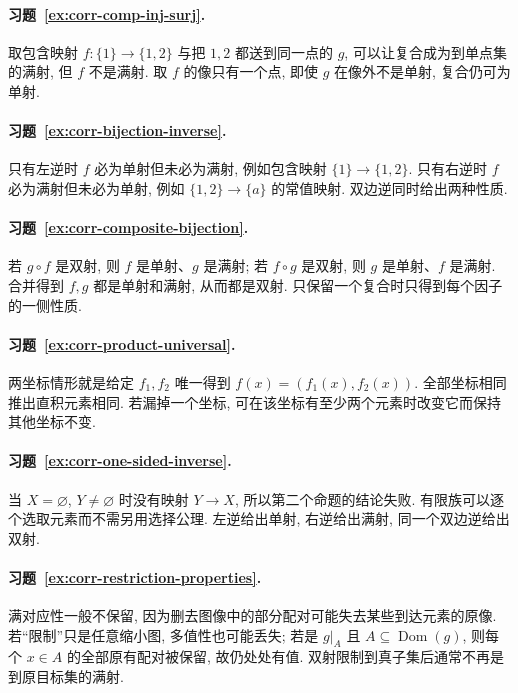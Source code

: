 \documentclass[usesamecnt, thmcnt=section, lang=cn, newtx, 10pt, scheme=chinese]{elegantbook}
\begin{document}
\paragraph*{习题~\ref{ex:corr-comp-inj-surj}.}
取包含映射 $f:\{1\}\to\{1,2\}$ 与把 $1,2$ 都送到同一点的 $g$, 可以让复合成为到单点集的满射, 但 $f$ 不是满射. 取 $f$ 的像只有一个点, 即使 $g$ 在像外不是单射, 复合仍可为单射.

\paragraph*{习题~\ref{ex:corr-bijection-inverse}.}
只有左逆时 $f$ 必为单射但未必为满射, 例如包含映射 $\{1\}\to\{1,2\}$. 只有右逆时 $f$ 必为满射但未必为单射, 例如 $\{1,2\}\to\{a\}$ 的常值映射. 双边逆同时给出两种性质.

\paragraph*{习题~\ref{ex:corr-composite-bijection}.}
若 $g\circ f$ 是双射, 则 $f$ 是单射、$g$ 是满射; 若 $f\circ g$ 是双射, 则 $g$ 是单射、$f$ 是满射. 合并得到 $f,g$ 都是单射和满射, 从而都是双射. 只保留一个复合时只得到每个因子的一侧性质.


\paragraph*{习题~\ref{ex:corr-product-universal}.}
两坐标情形就是给定 $f_1,f_2$ 唯一得到 $f(x)=(f_1(x),f_2(x))$. 全部坐标相同推出直积元素相同. 若漏掉一个坐标, 可在该坐标有至少两个元素时改变它而保持其他坐标不变.

\paragraph*{习题~\ref{ex:corr-one-sided-inverse}.}
当 $X=\varnothing$, $Y\neq\varnothing$ 时没有映射 $Y\to X$, 所以第二个命题的结论失败. 有限族可以逐个选取元素而不需另用选择公理. 左逆给出单射, 右逆给出满射, 同一个双边逆给出双射.


\paragraph*{习题~\ref{ex:corr-restriction-properties}.}
满对应性一般不保留, 因为删去图像中的部分配对可能失去某些到达元素的原像. 若``限制''只是任意缩小图, 多值性也可能丢失; 若是 $g|_A$ 且 $A\subseteq\operatorname{Dom}(g)$, 则每个 $x\in A$ 的全部原有配对被保留, 故仍处处有值. 双射限制到真子集后通常不再是到原目标集的满射.
\end{document}
